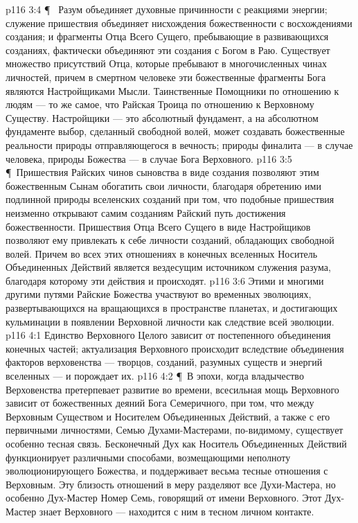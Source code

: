 \vs p116 3:4 \P\ \bibnobreakspace {} Разум объединяет духовные причинности с реакциями энергии; служение пришествия объединяет нисхождения божественности с восхождениями создания; и фрагменты Отца Всего Сущего, пребывающие в развивающихся созданиях, фактически объединяют эти создания с Богом в Раю. Существует множество присутствий Отца, которые пребывают в многочисленных чинах личностей, причем в смертном человеке эти божественные фрагменты Бога являются Настройщиками Мысли. Таинственные Помощники по отношению к людям --- то же самое, что Райская Троица по отношению к Верховному Существу. Настройщики --- это абсолютный фундамент, а на абсолютном фундаменте выбор, сделанный свободной волей, может создавать божественные реальности природы отправляющегося в вечность; природы финалита --- в случае человека, природы Божества --- в случае Бога Верховного.
\vs p116 3:5 \P\ Пришествия Райских чинов сыновства в виде создания позволяют этим божественным Сынам обогатить свои личности, благодаря обретению ими подлинной природы вселенских созданий при том, что подобные пришествия неизменно открывают самим созданиям Райский путь достижения божественности. Пришествия Отца Всего Сущего в виде Настройщиков позволяют ему привлекать к себе личности созданий, обладающих свободной волей. Причем во всех этих отношениях в конечных вселенных Носитель Объединенных Действий является вездесущим источником служения разума, благодаря которому эти действия и происходят.
\vs p116 3:6 Этими и многими другими путями Райские Божества участвуют во временных эволюциях, развертывающихся на вращающихся в пространстве планетах, и достигающих кульминации в появлении Верховной личности как следствие всей эволюции.
\vs p116 4:1 Единство Верховного Целого зависит от постепенного объединения конечных частей; актуализация Верховного происходит вследствие объединения факторов верховенства --- творцов, созданий, разумных существ и энергий вселенных --- и порождает их.
\vs p116 4:2 \P\ В эпохи, когда владычество Верховенства претерпевает развитие во времени, всесильная мощь Верховного зависит от божественных деяний Бога Семеричного, при том, что между Верховным Существом и Носителем Объединенных Действий, а также с его первичными личностями, Семью Духами\hyp{}Мастерами, по\hyp{}видимому, существует особенно тесная связь. Бесконечный Дух как Носитель Объединенных Действий функционирует различными способами, возмещающими неполноту эволюционирующего Божества, и поддерживает весьма тесные отношения с Верховным. Эту близость отношений в меру разделяют все Духи\hyp{}Мастера, но особенно Дух\hyp{}Мастер Номер Семь, говорящий от имени Верховного. Этот Дух\hyp{}Мастер знает Верховного --- находится с ним в тесном личном контакте.
